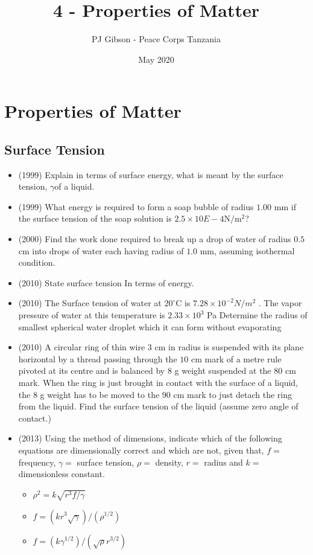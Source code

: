 \documentclass{article}
\title{\textbf{4 - Properties of Matter}}
\author{PJ Gibson - Peace Corps Tanzania}
\date{May 2020}
\newcommand{\mysection}[2]{\setcounter{section}{#1}\addtocounter{section}{-1}\section{#2}}
\begin{document}
\maketitle


\mysection{4}{Properties of Matter}

\subsection{Surface Tension}
\begin{itemize}
\item (1999)  Explain in terms of surface energy, what is meant by the surface tension, ​ $ \gamma $ ​ of a liquid. 
\item (1999)  What energy is required to form a soap bubble of radius $ 1.00$ mm if the surface tension of the soap solution is $ 2.5 \times 10$ ​$ E-4$ ​ N$/$m$ ^{2}$ ​ ?
\item (2000)  Find the work done required to break up a drop of water of radius $ 0.5$ cm into drops of water each having radius of $ 1.0$ mm, assuming isothermal condition.
\item (2010)  State surface tension In terms of energy. 
\item (2010)  The Surface tension of water at $ 20^{\circ}$C is $ 7.28 \times 10^{-2}N/m^{2}$ . The vapor pressure of water at this temperature is $ 2.33 \times 10^{3}$ Pa Determine the radius of smallest spherical water droplet which it can form without evaporating
\item (2010)  A circular ring of thin wire $ 3$ cm in radius is suspended with its plane horizontal by a thread passing through the $ 10$ cm mark of a metre rule pivoted at its centre and is balanced by $ 8$ g weight suspended at the $ 80$ cm mark. When the ring is just brought in contact with the surface of a liquid, the $ 8$ g weight has to be moved to the $ 90$ cm mark to just detach the ring from the liquid. Find the surface tension of the liquid (assume zero angle of contact.)
\item (2013)  Using the method of dimensions, indicate which of the following equations are dimensionally correct and which are not, given that, $ f=$ frequency, $ \gamma =$ surface tension, $ \rho =$ density, $ r=$ radius and $ k=$ dimensionless constant.
 \begin{itemize}
\item  $ \rho^{2}=k\sqrt{r^{3}f/\gamma }$
\item  $ f=(kr^{3}\sqrt{\gamma })/(\rho^{1/2})$
\item  $ f=(k\gamma^{1/2})/(\sqrt{\rho}r^{3/2})$

\end{itemize}
\end{itemize}
\end{document}
